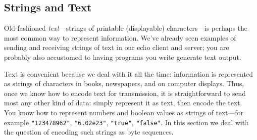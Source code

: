 \subsection{Strings and Text}


Old-fashioned \emph{text\/}---strings of printable (displayable)
characters---is perhaps the most common way to represent information.
We've already seen examples of sending and receiving strings of text in
our echo client and server; you are probably also accustomed to having
programs you write generate text output.

Text is convenient because we deal with it all the time:
information is represented as strings of characters in books,
newspapers, and on computer displays.  Thus, once we know how to
encode text for transmission, it is straightforward to 
send most any other kind of data:
simply represent it as text, then encode the text.  You know how to
represent numbers and boolean values as strings of text---for example
\texttt{"123478962"}, \texttt{"6.02e23"}, \texttt{"true"},
\texttt{"false"}.  In this section we deal with the question of
encoding such strings as byte sequences.





